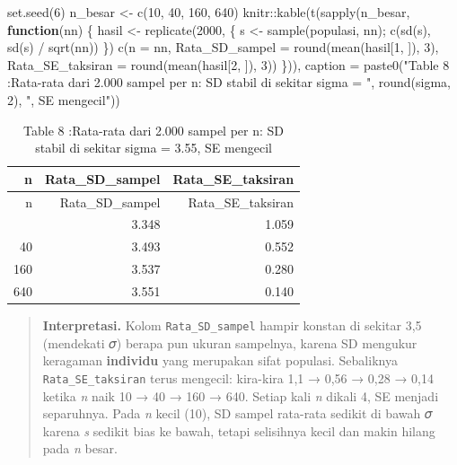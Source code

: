 \documentclass[
  indonesian,
  letterpaper,
]{book}
\newenvironment{Shaded}{\begin{snugshade}}{\end{snugshade}}
\newcommand{\AttributeTok}[1]{\textcolor[rgb]{0.40,0.45,0.13}{#1}}
\newcommand{\ControlFlowTok}[1]{\textcolor[rgb]{0.00,0.23,0.31}{\textbf{#1}}}
\newcommand{\DecValTok}[1]{\textcolor[rgb]{0.68,0.00,0.00}{#1}}
\newcommand{\FunctionTok}[1]{\textcolor[rgb]{0.28,0.35,0.67}{#1}}
\newcommand{\NormalTok}[1]{\textcolor[rgb]{0.00,0.23,0.31}{#1}}
\newcommand{\OtherTok}[1]{\textcolor[rgb]{0.00,0.23,0.31}{#1}}
\newcommand{\SpecialCharTok}[1]{\textcolor[rgb]{0.37,0.37,0.37}{#1}}
\newcommand{\StringTok}[1]{\textcolor[rgb]{0.13,0.47,0.30}{#1}}
\begin{document}
\begin{Shaded}
\begin{Highlighting}[]
\FunctionTok{set.seed}\NormalTok{(}\DecValTok{6}\NormalTok{)}
\NormalTok{n\_besar }\OtherTok{\textless{}{-}} \FunctionTok{c}\NormalTok{(}\DecValTok{10}\NormalTok{, }\DecValTok{40}\NormalTok{, }\DecValTok{160}\NormalTok{, }\DecValTok{640}\NormalTok{)}
\NormalTok{knitr}\SpecialCharTok{::}\FunctionTok{kable}\NormalTok{(}\FunctionTok{t}\NormalTok{(}\FunctionTok{sapply}\NormalTok{(n\_besar, }\ControlFlowTok{function}\NormalTok{(nn) \{}
\NormalTok{hasil }\OtherTok{\textless{}{-}} \FunctionTok{replicate}\NormalTok{(}\DecValTok{2000}\NormalTok{, \{ s }\OtherTok{\textless{}{-}} \FunctionTok{sample}\NormalTok{(populasi, nn); }\FunctionTok{c}\NormalTok{(}\FunctionTok{sd}\NormalTok{(s), }\FunctionTok{sd}\NormalTok{(s) }\SpecialCharTok{/} \FunctionTok{sqrt}\NormalTok{(nn)) \})}
\FunctionTok{c}\NormalTok{(}\AttributeTok{n =}\NormalTok{ nn, }\AttributeTok{Rata\_SD\_sampel =} \FunctionTok{round}\NormalTok{(}\FunctionTok{mean}\NormalTok{(hasil[}\DecValTok{1}\NormalTok{, ]), }\DecValTok{3}\NormalTok{),}
\AttributeTok{Rata\_SE\_taksiran =} \FunctionTok{round}\NormalTok{(}\FunctionTok{mean}\NormalTok{(hasil[}\DecValTok{2}\NormalTok{, ]), }\DecValTok{3}\NormalTok{))}
\NormalTok{\})), }\AttributeTok{caption =} \FunctionTok{paste0}\NormalTok{(}\StringTok{"Table 8 :Rata{-}rata dari 2.000 sampel per n: SD stabil di sekitar sigma = "}\NormalTok{,}
\FunctionTok{round}\NormalTok{(sigma, }\DecValTok{2}\NormalTok{), }\StringTok{", SE mengecil"}\NormalTok{))}
\end{Highlighting}
\end{Shaded}

\begin{longtable}[]{@{}rrr@{}}
\caption{Table 8 :Rata-rata dari 2.000 sampel per n: SD stabil di
sekitar sigma = 3.55, SE mengecil}\tabularnewline
\toprule\noalign{}
n & Rata\_SD\_sampel & Rata\_SE\_taksiran \\
\midrule\noalign{}
\endfirsthead
\toprule\noalign{}
n & Rata\_SD\_sampel & Rata\_SE\_taksiran \\
\midrule\noalign{}
\endhead
\bottomrule\noalign{}
\endlastfoot
10 & 3.348 & 1.059 \\
40 & 3.493 & 0.552 \\
160 & 3.537 & 0.280 \\
640 & 3.551 & 0.140 \\
\end{longtable}

\begin{quote}
\textbf{Interpretasi.} Kolom \texttt{Rata\_SD\_sampel} hampir konstan di
sekitar 3,5 (mendekati 𝜎) berapa pun ukuran sampelnya, karena SD
mengukur keragaman \textbf{individu} yang merupakan sifat populasi.
Sebaliknya \texttt{Rata\_SE\_taksiran} terus mengecil: kira-kira 1,1 →
0,56 → 0,28 → 0,14 ketika \emph{n} naik 10 → 40 → 160 → 640. Setiap kali
\emph{n} dikali 4, SE menjadi separuhnya. Pada \emph{n} kecil (10), SD
sampel rata-rata sedikit di bawah 𝜎 karena \emph{s} sedikit bias ke
bawah, tetapi selisihnya kecil dan makin hilang pada \emph{n} besar.
\end{quote}
\end{document}

